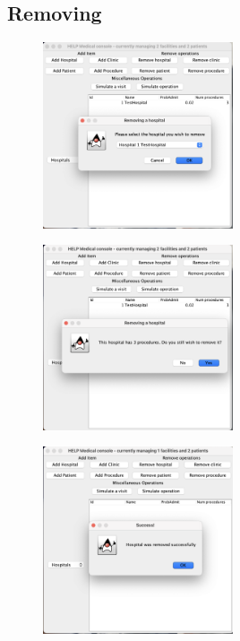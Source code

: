 \documentclass{article}
\begin{document}
\subsection{Removing}\label{sub:removing}
\begin{figure}
  \begin{center}
  \includegraphics[width=0.5\textwidth]{./figures/Remove/Hospital_1.png}
  \end{center}
\end{figure}

\begin{figure}
  \begin{center}
  \includegraphics[width=0.5\textwidth]{./figures/Remove/Hospital_2.png}
  \end{center}
\end{figure}

\begin{figure}
  \begin{center}
  \includegraphics[width=0.5\textwidth]{./figures/Remove/Hospital_3.png}
  \end{center}
\end{figure}
\end{document}
